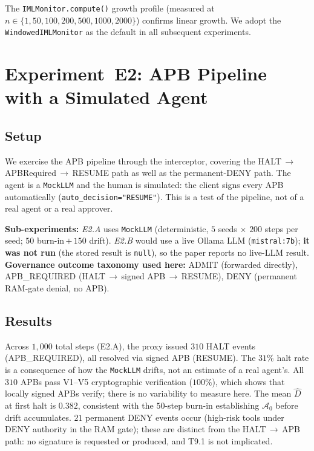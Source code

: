 \documentclass[11pt]{article}
\begin{document}
The \texttt{IMLMonitor.compute()} growth profile (measured at
$n \in \{1, 50, 100, 200, 500, 1000, 2000\}$) confirms linear growth.
We adopt the \texttt{WindowedIMLMonitor} as the default in all subsequent
experiments.

\section{Experiment~E2: APB Pipeline with a Simulated Agent}
\label{sec:exp2}

\subsection{Setup}

We exercise the APB pipeline through the interceptor, covering the
HALT\,$\to$\,APBRequired\,$\to$\,RESUME path as well as the permanent-DENY
path. The agent is a \texttt{MockLLM} and the human is simulated: the
client signs every APB automatically (\texttt{auto\_decision="RESUME"}).
This is a test of the pipeline, not of a real agent or a real approver.

\textbf{Sub-experiments:}
\emph{E2.A} uses \texttt{MockLLM} (deterministic, $5$ seeds $\times$ $200$ steps
per seed; $50$ burn-in\,$+$\,$150$ drift).
\emph{E2.B} would use a live Ollama LLM (\texttt{mistral:7b}); \textbf{it was
not run} (the stored result is \texttt{null}), so the paper reports no
live-LLM result.
\textbf{Governance outcome taxonomy used here:}
ADMIT (forwarded directly),
APB\_REQUIRED (HALT\,$\to$\,signed APB\,$\to$\,RESUME),
DENY (permanent RAM-gate denial, no APB).

\subsection{Results}



\noindent
Across $1{,}000$ total steps (E2.A), the proxy issued $310$ HALT events
(APB\_REQUIRED), all resolved via signed APB (RESUME). The $31\%$ halt
rate is a consequence of how the \texttt{MockLLM} drifts, not an
estimate of a real agent's.
All $310$ APBs pass V1--V5 cryptographic verification ($100\%$), which
shows that locally signed APBs verify; there is no variability to
measure here.
The mean $\widehat{D}$ at first halt is $0.382$, consistent with the
$50$-step burn-in establishing $\mathcal{A}_0$ before drift accumulates.
$21$ permanent DENY events occur (high-risk tools under DENY authority
in the RAM gate); these are distinct from the HALT\,$\to$\,APB path:
no signature is requested or produced, and T9.1 is not implicated.
\end{document}
